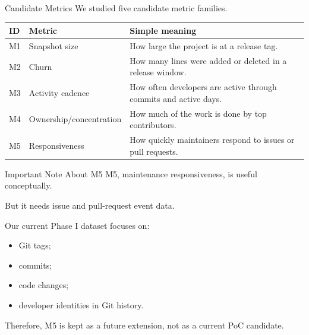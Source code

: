 \documentclass[aspectratio=169,11pt]{beamer}
\begin{document}
\begin{frame}{Candidate Metrics}
  We studied five candidate metric families.

  \begin{table}
    \footnotesize
    \begin{tabularx}{\textwidth}{p{1.0cm}p{3.7cm}X}
      \toprule
      ID & Metric & Simple meaning \\
      \midrule
      M1 & Snapshot size & How large the project is at a release tag. \\
      M2 & Churn & How many lines were added or deleted in a release window. \\
      M3 & Activity cadence & How often developers are active through commits and active days. \\
      M4 & Ownership/concentration & How much of the work is done by top contributors. \\
      M5 & Responsiveness & How quickly maintainers respond to issues or pull requests. \\
      \bottomrule
    \end{tabularx}
  \end{table}
\end{frame}

\begin{frame}{Important Note About M5}
  M5, maintenance responsiveness, is useful conceptually.

  \vspace{0.3cm}
  But it needs issue and pull-request event data.

  \vspace{0.3cm}
  Our current Phase I dataset focuses on:
  \begin{itemize}
    \item Git tags;
    \item commits;
    \item code changes;
    \item developer identities in Git history.
  \end{itemize}

  \vspace{0.3cm}
  Therefore, M5 is kept as a future extension, not as a current PoC candidate.
\end{frame}
\end{document}
